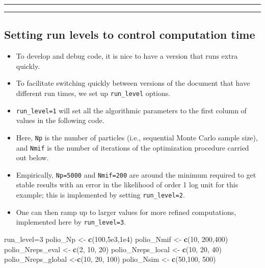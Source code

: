 \documentclass[]{article}
\newenvironment{Shaded}{\begin{snugshade}}{\end{snugshade}}
\newcommand{\KeywordTok}[1]{\textcolor[rgb]{0.13,0.29,0.53}{\textbf{#1}}}
\newcommand{\DecValTok}[1]{\textcolor[rgb]{0.00,0.00,0.81}{#1}}
\newcommand{\FloatTok}[1]{\textcolor[rgb]{0.00,0.00,0.81}{#1}}
\newcommand{\StringTok}[1]{\textcolor[rgb]{0.31,0.60,0.02}{#1}}
\newcommand{\NormalTok}[1]{#1}
\begin{document}
\begin{center}\rule{0.5\linewidth}{\linethickness}\end{center}

\begin{center}\rule{0.5\linewidth}{\linethickness}\end{center}

\subsection{Setting run levels to control computation
time}\label{setting-run-levels-to-control-computation-time}

\begin{itemize}
\item
  To develop and debug code, it is nice to have a version that runs
  extra quickly.
\item
  To facilitate switching quickly between versions of the document that
  have different run times, we set up \texttt{run\_level} options.
\item
  \texttt{run\_level=1} will set all the algorithmic parameters to the
  first column of values in the following code.
\item
  Here, \texttt{Np} is the number of particles (i.e., sequential Monte
  Carlo sample size), and \texttt{Nmif} is the number of iterations of
  the optimization procedure carried out below.
\item
  Empirically, \texttt{Np=5000} and \texttt{Nmif=200} are around the
  minimum required to get stable results with an error in the likelihood
  of order 1 log unit for this example; this is implemented by setting
  \texttt{run\_level=2}.
\item
  One can then ramp up to larger values for more refined computations,
  implemented here by \texttt{run\_level=3}.
\end{itemize}

\begin{Shaded}
\begin{Highlighting}[]
\NormalTok{run_level=}\DecValTok{3}
\NormalTok{polio_Np <-}\StringTok{          }\KeywordTok{c}\NormalTok{(}\DecValTok{100}\NormalTok{,}\FloatTok{5e3}\NormalTok{,}\FloatTok{1e4}\NormalTok{)}
\NormalTok{polio_Nmif <-}\StringTok{        }\KeywordTok{c}\NormalTok{(}\DecValTok{10}\NormalTok{, }\DecValTok{200}\NormalTok{,}\DecValTok{400}\NormalTok{)}
\NormalTok{polio_Nreps_eval <-}\StringTok{  }\KeywordTok{c}\NormalTok{(}\DecValTok{2}\NormalTok{,  }\DecValTok{10}\NormalTok{,  }\DecValTok{20}\NormalTok{)}
\NormalTok{polio_Nreps_local <-}\StringTok{ }\KeywordTok{c}\NormalTok{(}\DecValTok{10}\NormalTok{, }\DecValTok{20}\NormalTok{, }\DecValTok{40}\NormalTok{)}
\NormalTok{polio_Nreps_global <-}\KeywordTok{c}\NormalTok{(}\DecValTok{10}\NormalTok{, }\DecValTok{20}\NormalTok{, }\DecValTok{100}\NormalTok{)}
\NormalTok{polio_Nsim <-}\StringTok{        }\KeywordTok{c}\NormalTok{(}\DecValTok{50}\NormalTok{,}\DecValTok{100}\NormalTok{, }\DecValTok{500}\NormalTok{) }
\end{Highlighting}
\end{Shaded}
\end{document}

